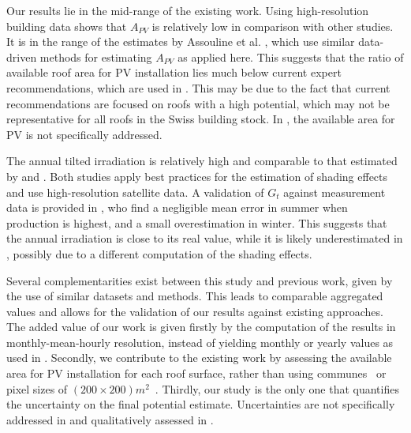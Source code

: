 Our results lie in the mid-range of the existing work. Using high-resolution building data shows that $A_{PV}$ is relatively low in comparison with other studies. It is in the range of the estimates by Assouline et al. \cite{assouline_large-scale_2018, assouline_quantifying_2017}, which use similar data-driven methods for estimating $A_{PV}$ as applied here. This suggests that the ratio of available roof area for PV installation lies much below current expert recommendations, which are used in \cite{portmann_sonnendach.ch:_2016}. This may be due to the fact that current recommendations are focused on roofs with a high potential, which may not be representative for all roofs in the Swiss building stock. In \cite{buffat_scalable_2018}, the available area for PV is not specifically addressed.

The annual tilted irradiation is relatively high and comparable to that estimated by \citet{klauser_solarpotentialanalyse_2016} and \citet{buffat_scalable_2018}. Both studies apply best practices for the estimation of shading effects and use high-resolution satellite data. A validation of $G_t$ against measurement data is provided in \cite{buffat_scalable_2018}, who find a negligible mean error in summer when production is highest, and a small overestimation in winter. 
This suggests that the annual irradiation is close to its real value, while it is likely underestimated in \cite{iea_potential_2002, assouline_quantifying_2017, assouline_large-scale_2018}, possibly due to a different computation of the shading effects.

Several complementarities exist between this study and previous work, given by the use of similar datasets and methods. This leads to comparable aggregated values and allows for the validation of our results against existing approaches.
The added value of our work is given firstly by the computation of the results in monthly-mean-hourly resolution, instead of yielding monthly or yearly values as used in \cite{klauser_solarpotentialanalyse_2016, assouline_quantifying_2017, assouline_large-scale_2018}. Secondly, we contribute to the existing work by assessing the available area for PV installation for each roof surface, rather than using communes~\cite{assouline_quantifying_2017} or pixel sizes of $(200 \times 200)m^2$~\cite{assouline_large-scale_2018}. Thirdly, our study is the only one that quantifies the uncertainty on the final potential estimate. 
Uncertainties are not specifically addressed in \cite{assouline_quantifying_2017, assouline_large-scale_2018, iea_potential_2002} and qualitatively assessed in \cite{klauser_solarpotentialanalyse_2016, buffat_scalable_2018}.

